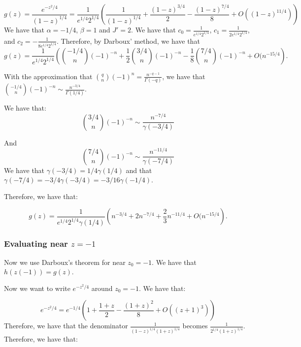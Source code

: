 \documentclass[]{article}
\begin{document}
\begin{equation}
	g(z) = \frac{e^{-z^2/4}}{(1 - z)^{1/4}} = \frac{1}{e^{1/4} 2^{1/4}} \left(\frac{1}{(1 - z)^{1/4}} + \frac{(1 - z)^{3/4}}{2} - \frac{(1 - z)^{7/4}}{8} +  O((1 - z)^{11/4})\right)
\end{equation}
We have that $\alpha = -1/4$, $\beta = 1$ and $J' = 2$. We have that $c_0 = \frac{1}{e^{1/4} 2^{1/4}}$, $c_1 = \frac{1}{2 e^{1/4} 2^{1/4}}$, and $c_2 = -\frac{1}{8 e^{1/4} 2^{1/4}}$.
Therefore, by Darboux' method, we have that 
\begin{equation}
	[z^n]g(z) = \frac{1}{e^{1/4} 2^{1/4}} \left( \binom{-1/4}{n}(-1)^{-n} +  \frac{1}{2}\binom{3/4}{n}(-1)^{-n} - \frac{1}{8} \binom{7/4}{n} (-1)^{-n} + O(n^{-15/4} \right).
\end{equation}

With the approximation that $\binom{q}{n}(-1)^n = \frac{n^{-q - 1}}{\Gamma(-q)}$, we have that $\binom{-1/4}{n}(-1)^{-n} \sim \frac{n^{-3/4}}{\Gamma(1/4)}$.

We have that:
\begin{equation}
	\binom{3/4}{n}(-1)^{-n} \sim \frac{n^{-7/4}}{\gamma(-3/4)}
\end{equation}

And
\begin{equation}
	\binom{7/4}{n}(-1)^{-n} \sim \frac{n^{-11/4}}{\gamma(-7/4)}
\end{equation}
We have that $\gamma(-3/4) = 1/4 \gamma(1/4)$ and that $\gamma(-7/4) = -3/4 \gamma(-3/4) = -3/16 \gamma(-1/4)$. 

Therefore, we have that:

\begin{equation}
	[z^n]g(z) = \frac{1}{e^{1/4} 2^{1/4}\gamma(1/4)} \left( n^{-3/4} +  2 n^{-7/4} + \frac{2}{3} n^{-11/4} + O(n^{-15/4} \right).
\end{equation}

\subsubsection{Evaluating near $z = -1$}
Now we use Darboux's theorem for near $z_0 = -1$. We have that $h(z(-1)) = g(z)$. 

Now we want to write $e^{-z^2/4}$ around $z_0 = -1$. We have that:

\begin{equation}
	e^{-z^2/4} = e^{-1/4} \left(1 + \frac{1 + z}{2} - \frac{(1 + z)^2}{8} + O((z + 1)^3)\right)
\end{equation}
Therefore, we have that the denominator $\frac{1}{(1 - z)^{1/4} (1 + z)^{1/4}}$ becomes $\frac{1}{2^{1/4}(1 + z)^{1/4}}$. Therefore, we have that:
\end{document}
